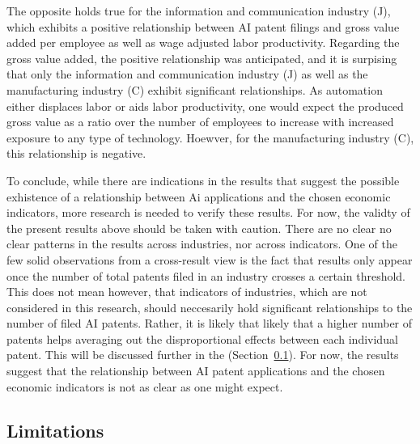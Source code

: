 \documentclass[
  11,
  a4paperpaper,
]{article}
\begin{document}
The opposite holds true for the information and communication industry
(J), which exhibits a positive relationship between AI patent filings
and gross value added per employee as well as wage adjusted labor
productivity. Regarding the gross value added, the positive relationship
was anticipated, and it is surpising that only the information and
communication industry (J) as well as the manufacturing industry (C)
exhibit significant relationships. As automation either displaces labor
or aids labor productivity, one would expect the produced gross value as
a ratio over the number of employees to increase with increased exposure
to any type of technology. Hoewver, for the manufacturing industry (C),
this relationship is negative.

To conclude, while there are indications in the results that suggest the
possible exhistence of a relationship between Ai applications and the
chosen economic indicators, more research is needed to verify these
results. For now, the validty of the present results above should be
taken with caution. There are no clear no clear patterns in the results
across industries, nor across indicators. One of the few solid
observations from a cross-result view is the fact that results only
appear once the number of total patents filed in an industry crosses a
certain threshold. This does not mean however, that indicators of
industries, which are not considered in this research, should
neccesarily hold significant relationships to the number of filed AI
patents. Rather, it is likely that likely that a higher number of
patents helps averaging out the disproportional effects between each
individual patent. This will be discussed further in the
 (Section~\ref{sec-limitations}). For now, the
results suggest that the relationship between AI patent applications and
the chosen economic indicators is not as clear as one might expect.

\subsection{Limitations}\label{sec-limitations}
\end{document}
